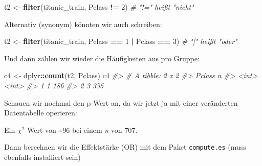 \documentclass[12pt,ngerman,]{book}
\makeatletter
\newenvironment{Shaded}{\begin{snugshade}}{\end{snugshade}}
\newcommand{\KeywordTok}[1]{\textcolor[rgb]{0.13,0.29,0.53}{\textbf{#1}}}
\newcommand{\DecValTok}[1]{\textcolor[rgb]{0.00,0.00,0.81}{#1}}
\newcommand{\StringTok}[1]{\textcolor[rgb]{0.31,0.60,0.02}{#1}}
\newcommand{\CommentTok}[1]{\textcolor[rgb]{0.56,0.35,0.01}{\textit{#1}}}
\newcommand{\OperatorTok}[1]{\textcolor[rgb]{0.81,0.36,0.00}{\textbf{#1}}}
\newcommand{\NormalTok}[1]{#1}
\newenvironment{kframe}{%
\medskip{}
\setlength{\fboxsep}{.8em}
 \def\at@end@of@kframe{}%
 \ifinner\ifhmode%
  \def\at@end@of@kframe{\end{minipage}}%
  \begin{minipage}{\columnwidth}%
 \fi\fi%
 \def\FrameCommand##1{\hskip\@totalleftmargin \hskip-\fboxsep
 \colorbox{shadecolor}{##1}\hskip-\fboxsep
     \hskip-\linewidth \hskip-\@totalleftmargin \hskip\columnwidth}%
 \MakeFramed {\advance\hsize-\width
   \@totalleftmargin\z@ \linewidth\hsize
   \@setminipage}}%
 {\par\unskip\endMakeFramed%
 \at@end@of@kframe}
\renewenvironment{Shaded}{\begin{kframe}}{\end{kframe}}
\theoremstyle{definition}
\theoremstyle{definition}
\theoremstyle{remark}
\makeatother
\begin{document}
\begin{Shaded}
\begin{Highlighting}[]
\NormalTok{t2 <-}\StringTok{ }\KeywordTok{filter}\NormalTok{(titanic_train, Pclass }\OperatorTok{!=}\StringTok{ }\DecValTok{2}\NormalTok{)  }\CommentTok{# "!=" heißt "nicht"}
\end{Highlighting}
\end{Shaded}

Alternativ (synonym) könnten wir auch schreiben:

\begin{Shaded}
\begin{Highlighting}[]
\NormalTok{t2 <-}\StringTok{ }\KeywordTok{filter}\NormalTok{(titanic_train, Pclass }\OperatorTok{==}\StringTok{ }\DecValTok{1} \OperatorTok{|}\StringTok{ }\NormalTok{Pclass }\OperatorTok{==}\StringTok{ }\DecValTok{3}\NormalTok{)  }\CommentTok{# "|" heißt "oder"}
\end{Highlighting}
\end{Shaded}

Und dann zählen wir wieder die Häufigkeiten aus pro Gruppe:

\begin{Shaded}
\begin{Highlighting}[]
\NormalTok{c4 <-}\StringTok{ }\NormalTok{dplyr}\OperatorTok{::}\KeywordTok{count}\NormalTok{(t2, Pclass)}
\NormalTok{c4}
\CommentTok{#> # A tibble: 2 x 2}
\CommentTok{#>   Pclass     n}
\CommentTok{#>    <int> <int>}
\CommentTok{#> 1      1   186}
\CommentTok{#> 2      3   355}
\end{Highlighting}
\end{Shaded}

Schauen wir nochmal den p-Wert an, da wir jetzt ja mit einer veränderten
Datentabelle operieren:

\begin{Shaded}
\end{Shaded}

Ein \(\chi^2\)-Wert von \textasciitilde{}96 bei einem \emph{n} von 707.

Dann berechnen wir die Effektstärke (OR) mit dem Paket
\texttt{compute.es} (muss ebenfalls installiert sein)
\end{document}
